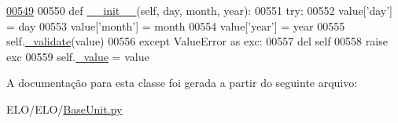 \begin{DoxyCode}
\hypertarget{classELO_1_1BaseUnit_1_1Date_l00549}{}\hyperlink{classELO_1_1BaseUnit_1_1Date_a97d924fa5f1b2a1d8afbdbfe17b6a852}{00549} 
00550     \textcolor{keyword}{def }\hyperlink{classELO_1_1BaseUnit_1_1Date_a97d924fa5f1b2a1d8afbdbfe17b6a852}{\_\_init\_\_}(self, day, month, year):
00551         \textcolor{keywordflow}{try}:
00552             value[\textcolor{stringliteral}{'day'}] = day
00553             value[\textcolor{stringliteral}{'month'}] = month
00554             value[\textcolor{stringliteral}{'year'}] = year
00555             self.\hyperlink{classELO_1_1BaseUnit_1_1IfBaseType_a11c68b128a7069e27c1c2fcb782269ea}{\_validate}(value)
00556         \textcolor{keywordflow}{except} ValueError \textcolor{keyword}{as} exc:
00557             del self
00558             \textcolor{keywordflow}{raise} exc
00559         self.\hyperlink{classELO_1_1BaseUnit_1_1IfBaseType_ad05d9d377fc4b99743c022cc8f6019d7}{\_value} = value

\end{DoxyCode}


A documentação para esta classe foi gerada a partir do seguinte arquivo\-:\begin{DoxyCompactItemize}
\item 
E\-L\-O/\-E\-L\-O/\hyperlink{BaseUnit_8py}{Base\-Unit.\-py}\end{DoxyCompactItemize}
